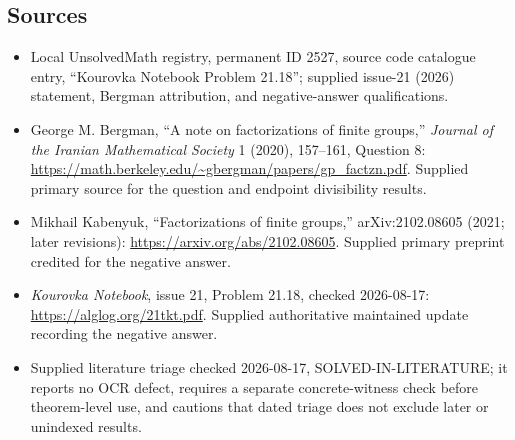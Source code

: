 \documentclass[11pt]{article}
\begin{document}
\subsection{Sources}
\begin{itemize}
\item Local UnsolvedMath registry, permanent ID 2527, source code catalogue entry, ``Kourovka Notebook Problem 21.18''; supplied issue-21 (2026) statement, Bergman attribution, and negative-answer qualifications.
\item George M. Bergman, ``A note on factorizations of finite groups,'' \emph{Journal of the Iranian Mathematical Society} 1 (2020), 157--161, Question 8: \url{https://math.berkeley.edu/~gbergman/papers/gp_factzn.pdf}. Supplied primary source for the question and endpoint divisibility results.
\item Mikhail Kabenyuk, ``Factorizations of finite groups,'' arXiv:2102.08605 (2021; later revisions): \url{https://arxiv.org/abs/2102.08605}. Supplied primary preprint credited for the negative answer.
\item \emph{Kourovka Notebook}, issue 21, Problem 21.18, checked 2026-08-17: \url{https://alglog.org/21tkt.pdf}. Supplied authoritative maintained update recording the negative answer.
\item Supplied literature triage checked 2026-08-17, SOLVED-IN-LITERATURE; it reports no OCR defect, requires a separate concrete-witness check before theorem-level use, and cautions that dated triage does not exclude later or unindexed results.
\end{itemize}
\end{document}
